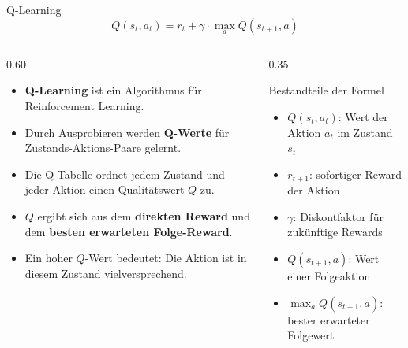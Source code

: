 \begin{frame}{Q-Learning}
\begin{equation*}
Q(s_t, a_t) = r_t + \gamma \cdot \max_{a} Q(s_{t+1}, a)
\end{equation*}
\footnotesize
\begin{columns}
\begin{column}{0.60\textwidth}

\begin{itemize}
\item \textbf{Q-Learning} ist ein Algorithmus für Reinforcement Learning. 
\item Durch Ausprobieren werden \textbf{Q-Werte} für Zustands-Aktions-Paare gelernt.
\item Die Q-Tabelle ordnet jedem Zustand und jeder Aktion einen Qualitätswert $Q$ zu.
\item $Q$ ergibt sich aus dem \textbf{direkten Reward} und dem \textbf{besten erwarteten Folge-Reward}.
\item Ein hoher $Q$-Wert bedeutet: Die Aktion ist in diesem Zustand vielversprechend.
\end{itemize}
\end{column}
\begin{column}{0.35\textwidth}
\begin{block}{\footnotesize Bestandteile der Formel}
\begin{itemize}
\item $Q(s_t,a_t)$: Wert der Aktion $a_t$ im Zustand $s_t$
\item $r_{t+1}$: sofortiger Reward der Aktion
\item $\gamma$: Diskontfaktor für zukünftige Rewards
\item $Q(s_{t+1},a)$: Wert einer Folgeaktion
\item $\max_a Q(s_{t+1},a)$: bester erwarteter Folgewert
\end{itemize}
\end{block}
\end{column}
\end{columns}
\end{frame}


